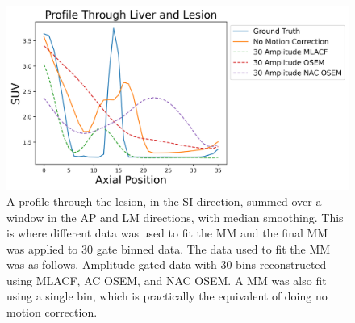             \begin{figure}
                \centering
                
                \includegraphics[width=1.0\linewidth]{figures/motion_correction_2_results_2_30_amplitude_profile.png}
                
                \captionsetup{singlelinecheck=false}
                \caption{
                    A profile through the lesion, in the \gls{SI} direction, summed over a window in the \gls{AP} and \gls{LM} directions, with median smoothing. This is where different data was used to fit the \gls{MM} and the final \gls{MM} was applied to $30$ gate binned data. The data used to fit the \gls{MM} was as follows. Amplitude gated data with $30$ bins reconstructed using \gls{MLACF}, \gls{AC} \gls{OSEM}, and \gls{NAC} \gls{OSEM}. A \gls{MM} was also fit using a single bin, which is practically the equivalent of doing no motion correction.
                }
                
                \label{fig:evaluation_of_pet_ct_motion_correction_incorporating_motion_models_using_mlacf_and_complex_gating_schemes_results_30_amplitude_profile}
            \end{figure}

